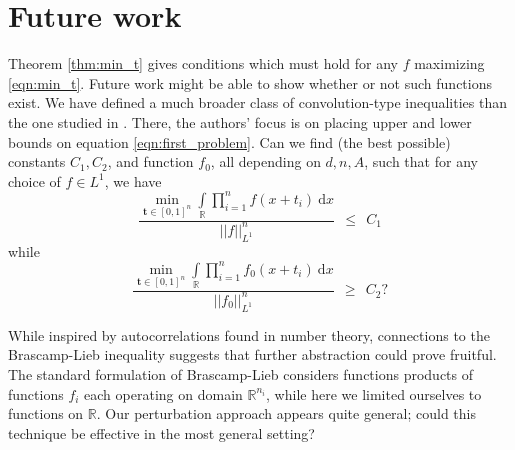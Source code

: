 \documentclass[11pt,reqno]{amsart}
\numberwithin{equation}{section}
\theoremstyle{plain}
\newcommand{\R}{\ensuremath{\mathbb{R}}}
\begin{document}

\section{Future work}\label{section:future_work}

Theorem \ref{thm:min_t} gives conditions which must hold for any $f$ maximizing \eqref{eqn:min_t}. Future work might be able to show whether or not such functions exist. We have defined a much broader class of convolution-type inequalities than the one studied in \cite{BS}. There, the authors' focus is on placing upper and lower bounds on equation \eqref{eqn:first_problem}. Can we find (the best possible) constants $C_1,C_2$, and function $f_0$, all depending on $d,n,A$, such that for any choice of $f \in L^1$, we have
\begin{equation}
    \frac{\min\limits_{\mathbf{t}\in[0,1]^n}\displaystyle\int\limits_{\R}\prod\limits_{i=1}^{n}f(x+t_i)\ \mathrm{d}x }{||f||_{L^1}^{n}} \ \ \le\  \  C_1
\end{equation}
while
\begin{equation}
    \frac{\min\limits_{\mathbf{t}\in[0,1]^n}\displaystyle\int\limits_{\R}\prod\limits_{i=1}^{n}f_0(x+t_i)\ \mathrm{d}x}{||f_0||_{L^1}^{n}} \ \ \ge \ \  C_2?
\end{equation}

While inspired by autocorrelations found in number theory, connections to the Brascamp-Lieb inequality suggests that further abstraction could prove fruitful. The standard formulation of Brascamp-Lieb considers functions products of functions $f_i$ each operating on domain $\R^{n_i}$, while here we limited ourselves to functions on $\R$. Our perturbation approach appears quite general; could this technique be effective in the most general setting?
\end{document}
